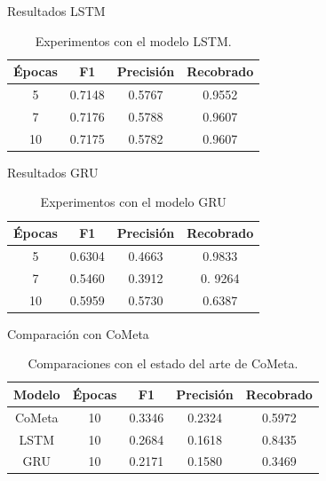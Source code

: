 \documentclass[12pt]{beamer}
\begin{document}
\begin{frame}{Resultados LSTM}
\begin{table}[hbt]
\centering
\begin{tabular}{c|c|c|c}
Épocas & F1 & Precisión & Recobrado\\
\hline
5 & 0.7148 & 0.5767 & 0.9552\\
\hline
7 & 0.7176 & 0.5788 & 0.9607\\
\hline
10 & 0.7175 & 0.5782 & 0.9607\\
\hline
\end{tabular}
\caption{Experimentos con el modelo LSTM. \label{Tabla:1}}
\end{table}
\end{frame}
\begin{frame}{Resultados GRU}
\begin{table}[htb]%
\centering
\begin{tabular}{c|c|c|c}
Épocas & F1 & Precisión & Recobrado\\
\hline
5 & 0.6304 & 0.4663 & 0.9833\\
\hline
7 & 0.5460 & 0.3912 & 0. 9264\\
\hline
10 & 0.5959 & 0.5730 & 0.6387\\
\hline
\end{tabular}
\caption{Experimentos con el modelo GRU \label{Tabla:2}}%
\end{table}
\end{frame}
\begin{frame}{Comparación con CoMeta}
\begin{table}[htb]%
\centering
\begin{tabular}{c|c|c|c|c}
Modelo & Épocas & F1 & Precisión & Recobrado\\
\hline
CoMeta & 10 & 0.3346 & 0.2324 & 0.5972\\
\hline
LSTM & 10 & 0.2684 & 0.1618 & 0.8435\\
\hline
GRU & 10 & 0.2171 & 0.1580 & 0.3469\\
\hline
\end{tabular}
\caption{Comparaciones con el estado del arte de CoMeta. \label{Tabla:3}}%
\end{table}
\end{frame}
\end{document}
